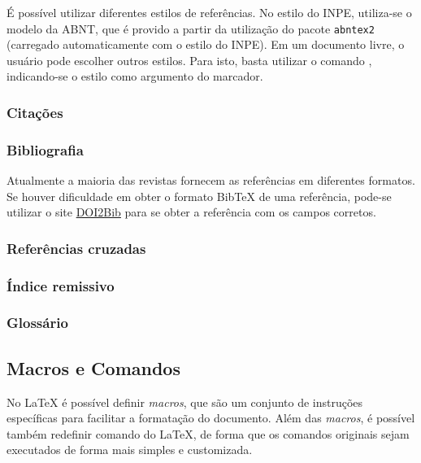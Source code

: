 É possível utilizar diferentes estilos de referências. No estilo do INPE, utiliza-se o modelo da ABNT, que é provido a partir da utilização do pacote {\tt abntex2} (carregado automaticamente com o estilo do INPE). Em um documento livre, o usuário pode escolher outros estilos. Para isto, basta utilizar o comando \texttt{}, indicando-se o estilo como argumento do marcador.

\subsubsection*{Citações}
\label{sec:cita}

\subsubsection*{Bibliografia}
\label{sec:biblio}

Atualmente a maioria das revistas fornecem as referências em diferentes formatos. Se houver dificuldade em obter o formato BibTeX de uma referência, pode-se utilizar o site \href{https://doi2bib.org}{DOI2Bib} para se obter a referência com os campos corretos.

\subsubsection*{Referências cruzadas}
\label{sec:refs_cruz}

\subsubsection*{Índice remissivo}
\label{sec:ind_rem}

\subsubsection*{Glossário}
\label{sec:glossario}

\subsection{Macros e Comandos}
\label{sec:mac_cmd}

No \LaTeX{} é possível definir \textit{macros}, que são um conjunto de instruções específicas para facilitar a formatação do documento. Além das \textit{macros}, é possível também redefinir comando do \LaTeX{}, de forma que os comandos originais sejam executados de forma mais simples e customizada.

